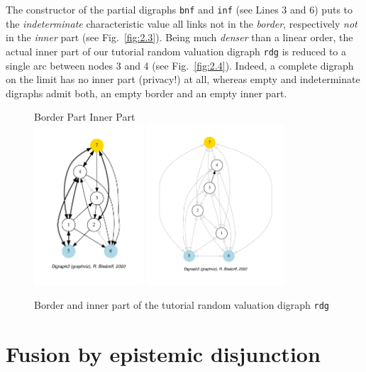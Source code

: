 The constructor of the partial digraphs \texttt{bnf} and \texttt{inf}  (see Lines 3 and 6) puts to the \emph{indeterminate} characteristic value all links not in the \emph{border}, respectively \emph{not} in the \emph{inner} part (see Fig.~\vref{fig:2.3}). Being much {\em denser\/} than a linear order, the actual inner part of our tutorial random valuation digraph \texttt{rdg} is reduced to a single arc between nodes 3 and 4 (see Fig.~\vref{fig:2.4}). Indeed, a complete digraph on the limit has no inner part (privacy!) at all, whereas empty and indeterminate digraphs admit both, an empty border and an empty inner part.
\begin{figure}[h]
  Border Part \hfill Inner Part \\
  \includegraphics[height=6cm]{Figures/2-4-tutRandValDigraph_border.pdf}\hfill
  \includegraphics[height=6cm]{Figures/2-4-tutRandValDigraph_inner.pdf}\hfill
\caption{Border and inner part of the tutorial random valuation digraph \texttt{rdg}}
\label{fig:2.4}       %
\end{figure}

\section{Fusion by epistemic disjunction}
\label{sec:2.5}

